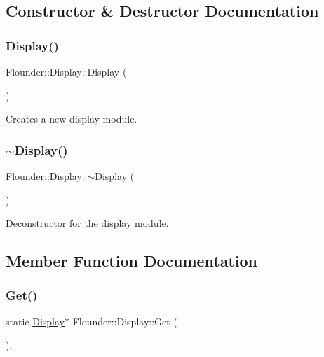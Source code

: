 \subsection{Constructor \& Destructor Documentation}
\mbox{\label{class_flounder_1_1_display_a78ec70fcff7c51125a43daf93cd987a4}} 
\subsubsection{\texorpdfstring{Display()}{Display()}}
{\footnotesize\ttfamily Flounder\+::\+Display\+::\+Display (\begin{DoxyParamCaption}{ }\end{DoxyParamCaption})}



Creates a new display module. 

\mbox{\label{class_flounder_1_1_display_aca6463f307f956c2b7627abc8f3d68c5}} 
\subsubsection{\texorpdfstring{$\sim$\+Display()}{~Display()}}
{\footnotesize\ttfamily Flounder\+::\+Display\+::$\sim$\+Display (\begin{DoxyParamCaption}{ }\end{DoxyParamCaption})}



Deconstructor for the display module. 



\subsection{Member Function Documentation}
\mbox{\label{class_flounder_1_1_display_af96f81e5e34b37397ab39cda9452091e}} 
\subsubsection{\texorpdfstring{Get()}{Get()}}
{\footnotesize\ttfamily static \hyperlink{class_flounder_1_1_display}{Display}$\ast$ Flounder\+::\+Display\+::\+Get (\begin{DoxyParamCaption}{ }\end{DoxyParamCaption})\hspace{0.3cm}{\ttfamily [inline]}, {\ttfamily [static]}}



